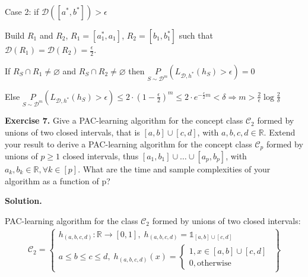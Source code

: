 \documentclass{article}
\newcommand{\<}{\langle}
\renewcommand{\>}{\rangle}
\renewcommand{\emptyset}{\varnothing}
\theoremstyle{definition}
\def\gC{{\mathcal{C}}}
\def\gD{{\mathcal{D}}}
\def\sR{{\mathbb{R}}}
\def\sone{{\mathds{1}}}
\newcommand{\uset}{\underset}
\def\sone{{\mathds{1}}}
\newcommand{\uset}{\underset}
\begin{document}
Case 2: if $\gD([a^*, b^*]) > \epsilon$

Build $R_1$ and $R_2$, $R_1 = [a_1^*, a_1]$, $R_2 = [b_1, b_1^*]$ such that 
$\gD(R_1) = \gD(R_2) = \frac{\epsilon}{2}$.

\begin{figure}[h]
\centering
{}
\end{figure}

If $R_S \cap R_1 \neq \emptyset$ and $R_S \cap R_2 \neq \emptyset$ then
  $\uset{S \sim \gD^m}{P}(L_{\gD, h^*}(h_S) > \epsilon) = 0$ \checkmark

Else $\uset{S \sim \gD^m}{P}(L_{\gD, h^*}(h_S) > \epsilon)
        \leq 2 \cdot \left(1 - \frac{\epsilon}{2}\right)^m
        \leq 2 \cdot e^{-\frac{\epsilon}{2}m}
        < \delta
        \Rightarrow \boxed{m > \frac{2}{\epsilon} \log \frac{2}{\delta}}$

\vspace{3mm}

\textbf{Exercise 7.} Give a PAC-learning algorithm for the concept class $\mathcal{C}_2$ formed by unions of two closed intervals, that is $[a, b] \cup [c, d]$, with $a, b, c, d \in \mathbb{R}$. Extend your result to derive a PAC-learning algorithm for the concept class $\mathcal{C}_p$ formed by unions of $p \geq 1$ closed intervals, thus $[a_1, b_1] \cup \dots \cup [a_p, b_p]$, with $a_k, b_k \in \mathbb{R}, \forall k \in [p]$. What are the time and sample complexities of your algorithm as a function of p?

\vspace{1mm}

\textbf{Solution.}

PAC-learning algorithm for the class $\gC_2$ formed by unions of two closed intervals: 
\begin{align*}
  \gC_2 = \left\lbrace
    \begin{array}{ll}
      h_{(a, b, c, d)} \colon \sR \rightarrow [0, 1], \;
      h_{(a, b, c, d)} = \sone_{[a, b] \cup [c, d]} \\
      a \leq b \leq c \leq d, \;
      h_{(a, b, c, d)}(x) = \left\lbrace
        \begin{array}{ll}
          1, x \in [a, b] \cup [c, d] \\
          0, \text{otherwise}
        \end{array}
      \right.
    \end{array}
  \right\rbrace
\end{align*}
\end{document}
